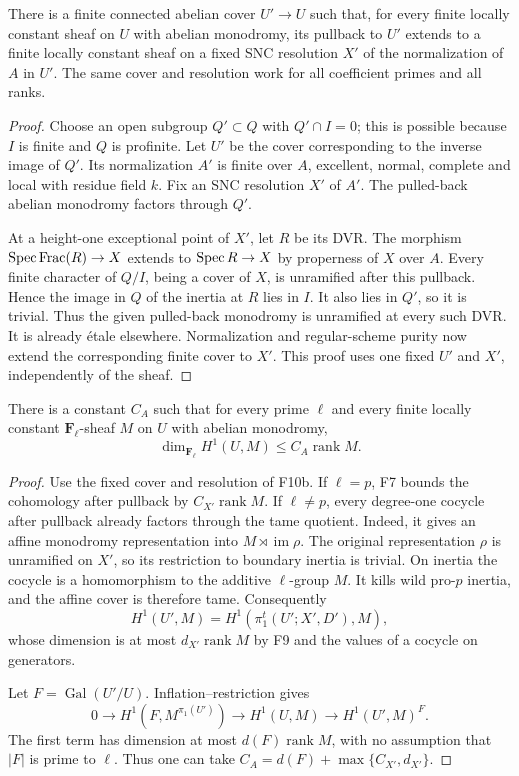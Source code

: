 \begin{corollary}
There is a finite connected abelian cover $U'\to U$ such that,
for every finite locally constant sheaf on $U$ with abelian
monodromy, its pullback to $U'$ extends to a finite locally constant
sheaf on a fixed SNC resolution $X'$ of the normalization of $A$
in $U'$. The same cover and resolution work for all coefficient
primes and all ranks.
\end{corollary}
\begin{proof}
Choose an open subgroup $Q'\subset Q$ with $Q'\cap I=0$; this
is possible because $I$ is finite and $Q$ is profinite. Let $U'$
be the cover corresponding to the inverse image of $Q'$.
Its normalization $A'$ is finite over $A$, excellent, normal,
complete and local with residue field $k$. Fix an SNC resolution
$X'$ of $A'$. The pulled-back abelian monodromy factors through
$Q'$.

At a height-one exceptional point of $X'$, let $R$ be its DVR.
The morphism $\operatorname{Spec}\operatorname{Frac}(R)\to X$ extends to
$\operatorname{Spec} R\to X$ by properness of $X$ over $A$. Every finite
character of $Q/I$, being a cover of $X$, is unramified after this
pullback. Hence the image in $Q$ of the inertia at $R$ lies in
$I$. It also lies in $Q'$, so it is trivial. Thus the given pulled-back
monodromy is unramified at every such DVR. It is already \'etale
elsewhere. Normalization and regular-scheme purity now extend the
corresponding finite cover to $X'$. This proof uses one fixed
$U'$ and $X'$, independently of the sheaf.
\end{proof}

\begin{proposition}
There is a constant $C_A$ such that for every prime $\ell$ and
every finite locally constant $\mathbf F_\ell$-sheaf $M$ on $U$
with abelian monodromy,
\[
                       \dim_{\mathbf F_\ell}H^1(U,M)
                       \leq C_A\operatorname{rank}M.
 \tag{F10.7}
\]
\end{proposition}
\begin{proof}
Use the fixed cover and resolution of F10b. If $\ell=p$, F7
bounds the cohomology after pullback by $C_{X'}\operatorname{rank}M$.
If $\ell\ne p$, every degree-one cocycle after pullback already
factors through the tame quotient. Indeed, it gives an affine
monodromy representation into $M\rtimes\operatorname{im}\rho$.
The original representation $\rho$ is unramified on $X'$, so its
restriction to boundary inertia is trivial. On inertia the cocycle
is a homomorphism to the additive $\ell$-group $M$. It kills wild
pro-$p$ inertia, and the affine cover is therefore tame.
Consequently
\[
 H^1(U',M)=H^1(\pi_1^t(U';X',D'),M),
\]
whose dimension is at most $d_{X'}\operatorname{rank}M$ by F9
and the values of a cocycle on generators.

Let $F=\operatorname{Gal}(U'/U)$. Inflation--restriction gives
\[
 0\to H^1(F,M^{\pi_1(U')})\to H^1(U,M)
          \to H^1(U',M)^F.
\]
The first term has dimension at most $d(F)\operatorname{rank}M$,
with no assumption that $|F|$ is prime to $\ell$.
Thus one can take
$C_A=d(F)+\max\{C_{X'},d_{X'}\}$.
\end{proof}

